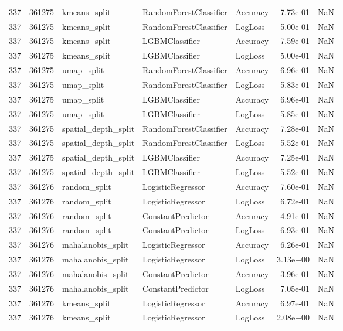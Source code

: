 \begin{tabular}{rrlllrr}
337 & 361275 & kmeans\_split & RandomForestClassifier & Accuracy & 7.73e-01 & NaN \\
337 & 361275 & kmeans\_split & RandomForestClassifier & LogLoss & 5.00e-01 & NaN \\
337 & 361275 & kmeans\_split & LGBMClassifier & Accuracy & 7.59e-01 & NaN \\
337 & 361275 & kmeans\_split & LGBMClassifier & LogLoss & 5.00e-01 & NaN \\
337 & 361275 & umap\_split & RandomForestClassifier & Accuracy & 6.96e-01 & NaN \\
337 & 361275 & umap\_split & RandomForestClassifier & LogLoss & 5.83e-01 & NaN \\
337 & 361275 & umap\_split & LGBMClassifier & Accuracy & 6.96e-01 & NaN \\
337 & 361275 & umap\_split & LGBMClassifier & LogLoss & 5.85e-01 & NaN \\
337 & 361275 & spatial\_depth\_split & RandomForestClassifier & Accuracy & 7.28e-01 & NaN \\
337 & 361275 & spatial\_depth\_split & RandomForestClassifier & LogLoss & 5.52e-01 & NaN \\
337 & 361275 & spatial\_depth\_split & LGBMClassifier & Accuracy & 7.25e-01 & NaN \\
337 & 361275 & spatial\_depth\_split & LGBMClassifier & LogLoss & 5.52e-01 & NaN \\
337 & 361276 & random\_split & LogisticRegressor & Accuracy & 7.60e-01 & NaN \\
337 & 361276 & random\_split & LogisticRegressor & LogLoss & 6.72e-01 & NaN \\
337 & 361276 & random\_split & ConstantPredictor & Accuracy & 4.91e-01 & NaN \\
337 & 361276 & random\_split & ConstantPredictor & LogLoss & 6.93e-01 & NaN \\
337 & 361276 & mahalanobis\_split & LogisticRegressor & Accuracy & 6.26e-01 & NaN \\
337 & 361276 & mahalanobis\_split & LogisticRegressor & LogLoss & 3.13e+00 & NaN \\
337 & 361276 & mahalanobis\_split & ConstantPredictor & Accuracy & 3.96e-01 & NaN \\
337 & 361276 & mahalanobis\_split & ConstantPredictor & LogLoss & 7.05e-01 & NaN \\
337 & 361276 & kmeans\_split & LogisticRegressor & Accuracy & 6.97e-01 & NaN \\
337 & 361276 & kmeans\_split & LogisticRegressor & LogLoss & 2.08e+00 & NaN \\

\end{tabular}
